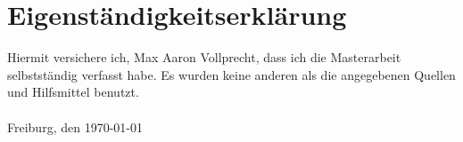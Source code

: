 \chapter*{Eigenständigkeitserklärung}
\vspace{0.8cm}
Hiermit versichere ich, Max Aaron Vollprecht, dass ich die Masterarbeit selbstständig verfasst habe. Es wurden keine anderen als die angegebenen Quellen und Hilfsmittel benutzt.
\\ \\
Freiburg, den \today